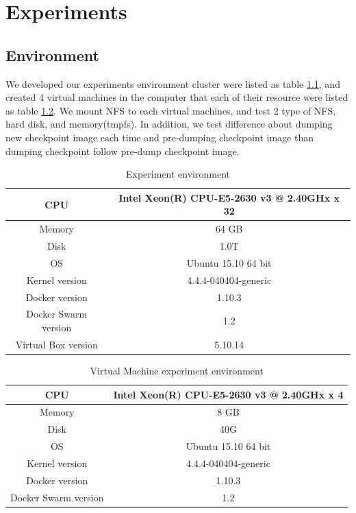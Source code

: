 \chapter{Experiments}
\label{chap:experiments}
\section{Environment}
We developed our experiments environment cluster were listed as table \ref{talbe:Host}, and created 4 virtual machines in the computer that each of their resource were listed as table \ref{talbe:Virtual Machine}. We mount NFS to each virtual machines, and test 2 type of NFS, hard disk, and memory(tmpfs). In addition, we test difference about dumping new checkpoint image each time and pre-dumping checkpoint image than dumping checkpoint follow pre-dump checkpoint image.

\begin{table}[h]
\begin{center}
\begin{tabular}{|c|c|} \hline
CPU & Intel Xeon(R) CPU-E5-2630 v3 @ 2.40GHx x 32 \\ \hline
Memory & 64 GB \\ \hline
Disk & 1.0T \\ \hline
OS & Ubuntu 15.10 64 bit \\ \hline
Kernel version & 4.4.4-040404-generic \\ \hline
Docker version & 1.10.3 \\ \hline
Docker Swarm version & 1.2 \\ \hline
Virtual Box version & 5.10.14 \\ \hline
\end{tabular}
\end{center}
\caption{Experiment environment}
\label{talbe:Host}
\end{table}

\begin{table}[h]
\begin{center}
\begin{tabular}{|c|c|} \hline
CPU & Intel Xeon(R) CPU-E5-2630 v3 @ 2.40GHx x 4 \\ \hline
Memory & 8 GB \\ \hline
Disk & 40G \\ \hline
OS & Ubuntu 15.10 64 bit \\ \hline
Kernel version & 4.4.4-040404-generic \\ \hline
Docker version & 1.10.3 \\ \hline
Docker Swarm version & 1.2 \\ \hline
\end{tabular}
\end{center}
\caption{Virtual Machine experiment environment}
\label{talbe:Virtual Machine}
\end{table}

